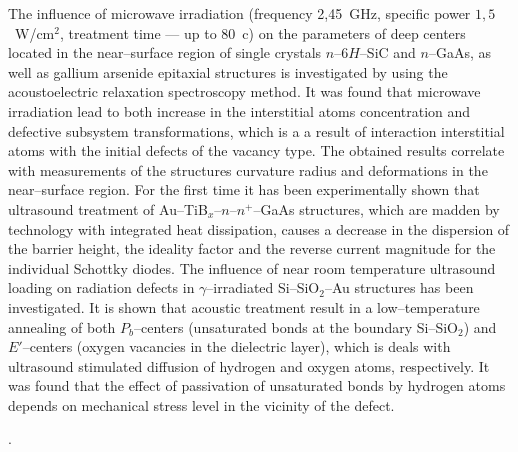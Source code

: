 The influence of microwave irradiation (frequency 2,45~GHz, specific power $1,5$~W/cm$^2$, treatment time --- up to 80~c) on the parameters of deep centers located in the near--surface region of single crystals $n$--6$H$--SiC and $n$--GaAs, as well as gallium arsenide epitaxial structures is investigated by using the acoustoelectric relaxation spectroscopy method.
It was found that microwave irradiation lead to both increase in the interstitial atoms concentration and defective subsystem transformations, which is a a result of interaction interstitial atoms with the initial defects of the vacancy type.
The obtained results correlate with measurements of the structures curvature radius and deformations in the near--surface region.
For the first time it has been experimentally shown that ultrasound treatment of Au--TiB$_x$--$n$--$n^+$--GaAs structures, which  are 
madden by technology with integrated heat dissipation, causes a decrease in the dispersion of the barrier height, the ideality factor and the reverse current magnitude for the individual Schottky diodes.
The influence of near room temperature ultrasound loading on radiation defects in $\gamma$--irradiated Si--SiO$_2$--Au structures has been investigated.
It is shown that acoustic treatment result in a low--temperature annealing of both $P_b$--centers (unsaturated bonds at the boundary Si--SiO$_2$) and 
$E'$--centers (oxygen vacancies in the dielectric layer), which is deals with ultrasound stimulated diffusion of hydrogen and oxygen atoms, respectively.
It was found that the effect of passivation of unsaturated bonds by hydrogen atoms depends on mechanical stress level in the vicinity of the defect.


\vspace{0.7cm}
\noindent
\keywordsEn.

\vspace{2cm}



